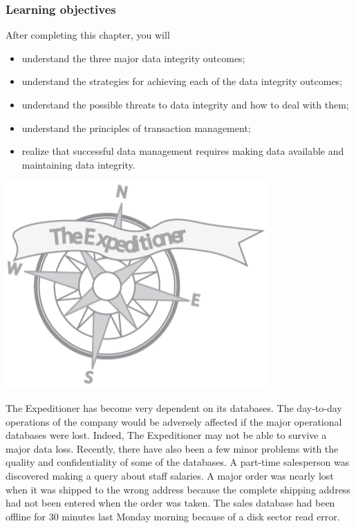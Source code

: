 \documentclass[
]{article}
\begin{document}
\hypertarget{learning-objectives-14}{%
\subsubsection*{Learning objectives}\label{learning-objectives-14}}

After completing this chapter, you will

\begin{itemize}
\item
  understand the three major data integrity outcomes;
\item
  understand the strategies for achieving each of the data integrity
  outcomes;
\item
  understand the possible threats to data integrity and how to deal
  with them;
\item
  understand the principles of transaction management;
\item
  realize that successful data management requires making data
  available and maintaining data integrity.
\end{itemize}

\includegraphics{Figures/Chapter 1/expeditioner.png}

The Expeditioner has become very dependent on its databases. The
day-to-day operations of the company would be adversely affected if the
major operational databases were lost. Indeed, The Expeditioner may not
be able to survive a major data loss. Recently, there have also been a
few minor problems with the quality and confidentiality of some of the
databases. A part-time salesperson was discovered making a query about
staff salaries. A major order was nearly lost when it was shipped to the
wrong address because the complete shipping address had not been entered
when the order was taken. The sales database had been offline for 30
minutes last Monday morning because of a disk sector read error.
\end{document}
